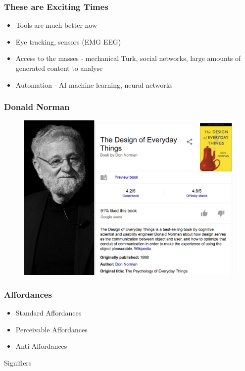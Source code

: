 \begin{frame}
	\frametitle{These are Exciting Times}
	\begin{itemize}
		\item Tools are much better now
		\item Eye tracking, sensors (EMG EEG)
		\item Access to the masses - mechanical Turk, social networks, large amounts of generated content to analyse
		\item Automation - AI machine learning, neural networks
	\end{itemize}
\end{frame}

\begin{frame}
	\frametitle{Donald Norman}
	\begin{figure}
		\includegraphics[scale=.2]{assets/don}
	\end{figure}
\end{frame}

\begin{frame}
	\frametitle{Affordances}
	\begin{itemize}
		\item Standard Affordances
		\item Perceivable Affordances
		\item Anti-Affordances
	\end{itemize}
\end{frame}

\begin{frame}
	\begin{center}
		\huge Signifiers
	\end{center}
\end{frame}


